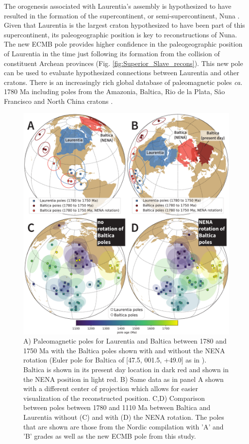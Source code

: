 \documentclass[draft]{agujournal2019}
\begin{document}
The orogenesis associated with Laurentia's assembly is hypothesized to have resulted in the formation of the supercontinent, or semi-supercontinent, Nuna \cite{Hoffman1997a, Evans2011a}. Given that Laurentia is the largest craton hypothesized to have been part of this supercontinent, its paleogeographic position is key to reconstructions of Nuna. The new ECMB pole provides higher confidence in the paleogeographic position of Laurentia in the time just following its formation from the collision of constituent Archean provinces (Fig. \ref{fig:Superior_Slave_recons}). This new pole can be used to evaluate hypothesized connections between Laurentia and other cratons. There is an increasingly rich global database of paleomagnetic poles \textit{ca.} 1780 Ma including poles from the Amazonia, Baltica, Rio de la Plata, S\~{a}o Francisco and North China cratons \cite{Zhang2012a, Xu2014a, Bispo-Santos2014a, DAgrella-Filho2020a}.

\begin{figure}[!ht]
\noindent\includegraphics[width=\textwidth]{./figures/Laurentia_Baltica.pdf}
\caption{\small{A) Paleomagnetic poles for Laurentia and Baltica between 1780 and 1750 Ma with the Baltica poles shown with and without the NENA rotation (Euler pole for Baltica of [47.5\textdegree, 001.5\textdegree, +49.0\textdegree] as in ). Baltica is shown in its present day location in dark red and shown in the NENA position in light red. B) Same data as in panel A shown with a different center of projection which allows for easier visualization of the reconstructed position. C,D) Comparison between poles between 1780 and 1110 Ma between Baltica and Laurentia without (C) and with (D) the NENA rotation. The poles that are shown are those from the Nordic compilation with 'A' and 'B' grades as well as the new ECMB pole from this study.}}
\label{fig:Laurentia_Baltica}
\end{figure}
\end{document}

